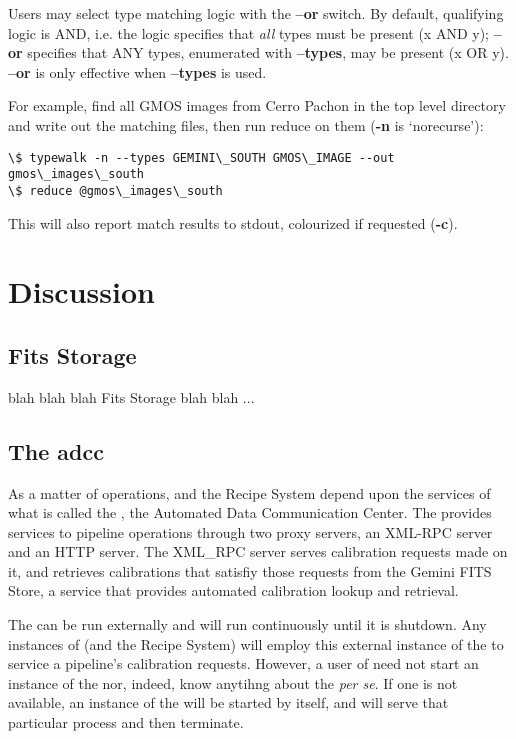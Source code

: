 \documentclass[letterpaper,10pt,english]{sphinxmanual}
\begin{document}
Users may select type matching logic with the \textbf{--or} switch. By default,
qualifying logic is AND, i.e. the logic specifies that \emph{all} types must be
present (x AND y); \textbf{--or} specifies that ANY types, enumerated with
\textbf{--types}, may be present (x OR y). \textbf{--or} is only effective when
\textbf{--types} is used.

For example, find all GMOS images from Cerro Pachon in the top level
directory and write out the matching files, then run reduce on them
(\textbf{-n} is `norecurse'):

\begin{Verbatim}[commandchars=\\\{\}]
\$ typewalk -n --types GEMINI\_SOUTH GMOS\_IMAGE --out gmos\_images\_south
\$ reduce @gmos\_images\_south
\end{Verbatim}

This will also report match results to stdout, colourized if requested (\textbf{-c}).


\chapter{Discussion}
\label{discuss:discussion}\label{discuss::doc}

\section{Fits Storage}
\label{discuss:fits-storage}\label{discuss:fitsstore}
blah blah blah Fits Storage blah blah ...


\section{The adcc}
\label{discuss:adcc}\label{discuss:the-adcc}
As a matter of operations,  and the Recipe System depend upon the
services of what is called the , the Automated Data Communication Center.
The  provides services to pipeline operations through two proxy servers,
an XML-RPC server and an HTTP server. The XML\_RPC server serves calibration
requests made on it, and retrieves calibrations that satisfiy those requests
from the Gemini FITS Store, a service that provides automated calibration
lookup and retrieval.

The  can be run externally and will run continuously until it is
shutdown. Any instances of  (and the Recipe System) will employ
this external instance of the  to service a pipeline's calibration
requests. However, a user of  need not start an instance of the
 nor, indeed, know anytihng about the  \emph{per se}. If one is not
available, an instance of the  will be started by  itself,
and will serve that particular  process and then terminate.
\end{document}
